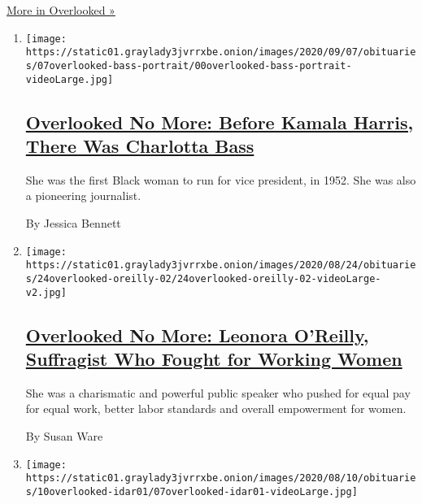 \href{/spotlight/overlooked}{More in Overlooked »}

\begin{enumerate}
\def\labelenumi{\arabic{enumi}.}
\item
  \texttt{[image: https://static01.graylady3jvrrxbe.onion/images/2020/09/07/obituaries/07overlooked-bass-portrait/00overlooked-bass-portrait-videoLarge.jpg]}

  \hypertarget{overlooked-no-more-before-kamala-harris-there-was-charlotta-bass}{%
  \subsection{\texorpdfstring{\href{/2020/09/04/obituaries/charlotta-bass-vice-president-overlooked.html}{Overlooked
  No More: Before Kamala Harris, There Was Charlotta
  Bass}}{Overlooked No More: Before Kamala Harris, There Was Charlotta Bass}}\label{overlooked-no-more-before-kamala-harris-there-was-charlotta-bass}}

  She was the first Black woman to run for vice president, in 1952. She
  was also a pioneering journalist.

  By Jessica Bennett
\item
  \texttt{[image: https://static01.graylady3jvrrxbe.onion/images/2020/08/24/obituaries/24overlooked-oreilly-02/24overlooked-oreilly-02-videoLarge-v2.jpg]}

  \hypertarget{overlooked-no-more-leonora-oreilly-suffragist-who-fought-for-working-women}{%
  \subsection{\texorpdfstring{\href{/2020/08/21/obituaries/leonora-oreilly-overlooked.html}{Overlooked
  No More: Leonora O'Reilly, Suffragist Who Fought for Working
  Women}}{Overlooked No More: Leonora O'Reilly, Suffragist Who Fought for Working Women}}\label{overlooked-no-more-leonora-oreilly-suffragist-who-fought-for-working-women}}

  She was a charismatic and powerful public speaker who pushed for equal
  pay for equal work, better labor standards and overall empowerment for
  women.

  By Susan Ware
\item
  \texttt{[image: https://static01.graylady3jvrrxbe.onion/images/2020/08/10/obituaries/10overlooked-idar01/07overlooked-idar01-videoLarge.jpg]}

  \hypertarget{overlooked-no-more-jovita-iduxe1r-who-promoted-rights-of-mexican-americans-and-women}{%
}
\end{enumerate}
